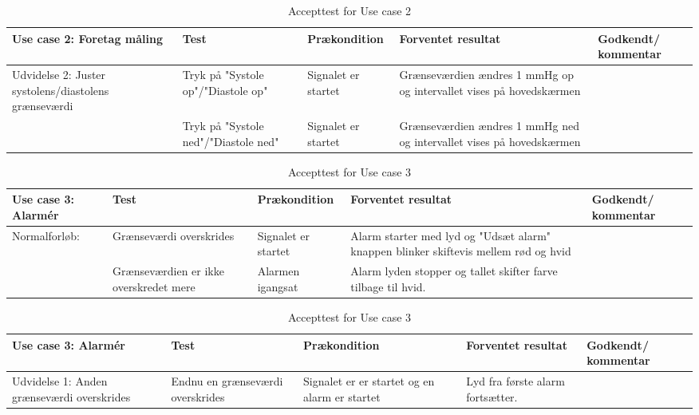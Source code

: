 \begin{table}[H]
\caption{Accepttest for Use case 2}\label{tab:tabel12}
\begin{tabular}{|>{\raggedright\arraybackslash}p{2.5cm}| >{\raggedright\arraybackslash}p{2.9cm} | >{\raggedright\arraybackslash}p{2.9cm} | >{\raggedright\arraybackslash}p{2.9cm} | >{\raggedright\arraybackslash}p{2.8cm} |}
   \hline
   \textbf{Use case 2: Foretag måling } &\textbf{Test}& \textbf{Prækondition} & \textbf{Forventet resultat} & \textbf{Godkendt/ kommentar}\\ \hline
   Udvidelse 2: Juster systolens/diastolens grænseværdi& Tryk på "Systole op"/"Diastole op"& Signalet er startet & Grænseværdien ændres 1 mmHg op og intervallet vises på hovedskærmen &\\\hline
   &Tryk på "Systole ned"/"Diastole ned" & Signalet er startet & Grænseværdien ændres 1 mmHg ned og intervallet vises på hovedskærmen & \\\hline
\end{tabular}
\end{table}

\begin{table}[H]
\caption{Accepttest for Use case 3}\label{tab:tabel13}
\begin{tabular}{|>{\raggedright\arraybackslash}p{2.5cm}| >{\raggedright\arraybackslash}p{2.9cm} | >{\raggedright\arraybackslash}p{2.9cm} | >{\raggedright\arraybackslash}p{2.9cm} | >{\raggedright\arraybackslash}p{2.8cm} |}
   \hline
   \textbf{Use case 3: Alarmér } &\textbf{Test}& \textbf{Prækondition} & \textbf{Forventet resultat} & \textbf{Godkendt/ kommentar}\\ \hline
   Normalforløb:& Grænseværdi overskrides& Signalet er startet & Alarm starter med lyd og "Udsæt alarm" knappen blinker skiftevis mellem rød og hvid &\\\hline
   & Grænseværdien er ikke overskredet mere & Alarmen igangsat & Alarm lyden stopper og tallet skifter farve tilbage til hvid. & \\\hline
\end{tabular}
\end{table}

\begin{table}[H]
\caption{Accepttest for Use case 3}\label{tab:tabel14}
\begin{tabular}{|>{\raggedright\arraybackslash}p{2.5cm}| >{\raggedright\arraybackslash}p{2.9cm} | >{\raggedright\arraybackslash}p{2.9cm} | >{\raggedright\arraybackslash}p{2.9cm} | >{\raggedright\arraybackslash}p{2.8cm} |}
   \hline
   \textbf{Use case 3: Alarmér } &\textbf{Test}& \textbf{Prækondition} & \textbf{Forventet resultat} & \textbf{Godkendt/ kommentar}\\ \hline
   Udvidelse 1: Anden grænseværdi overskrides & Endnu en grænseværdi overskrides & Signalet er er startet og en alarm er startet & Lyd fra første alarm fortsætter. &\\\hline
\end{tabular}
\end{table}

